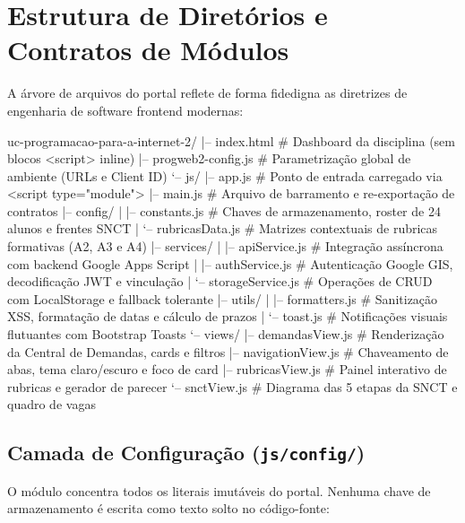 \section{Estrutura de Diretórios e Contratos de Módulos}\label{sec:estrutura}

A árvore de arquivos do portal reflete de forma fidedigna as diretrizes de engenharia de software frontend modernas:

\begin{arvore}
uc-programacao-para-a-internet-2/
|-- index.html                 # Dashboard da disciplina (sem blocos <script> inline)
|-- progweb2-config.js         # Parametrização global de ambiente (URLs e Client ID)
`-- js/
    |-- app.js                 # Ponto de entrada carregado via <script type="module">
    |-- main.js                # Arquivo de barramento e re-exportação de contratos
    |-- config/
    |   |-- constants.js       # Chaves de armazenamento, roster de 24 alunos e frentes SNCT
    |   `-- rubricasData.js    # Matrizes contextuais de rubricas formativas (A2, A3 e A4)
    |-- services/
    |   |-- apiService.js      # Integração assíncrona com backend Google Apps Script
    |   |-- authService.js     # Autenticação Google GIS, decodificação JWT e vinculação
    |   `-- storageService.js  # Operações de CRUD com LocalStorage e fallback tolerante
    |-- utils/
    |   |-- formatters.js      # Sanitização XSS, formatação de datas e cálculo de prazos
    |   `-- toast.js           # Notificações visuais flutuantes com Bootstrap Toasts
    `-- views/
        |-- demandasView.js    # Renderização da Central de Demandas, cards e filtros
        |-- navigationView.js  # Chaveamento de abas, tema claro/escuro e foco de card
        |-- rubricasView.js    # Painel interativo de rubricas e gerador de parecer
        `-- snctView.js        # Diagrama das 5 etapas da SNCT e quadro de vagas
\end{arvore}

\subsection{Camada de Configuração (\texttt{js/config/})}

O módulo  concentra todos os literais imutáveis do portal. Nenhuma chave de armazenamento é escrita como texto solto no código-fonte:


